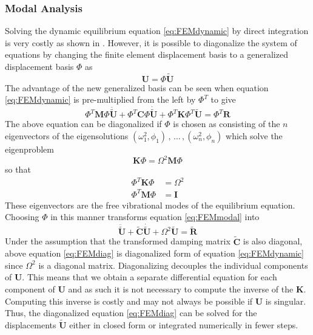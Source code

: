\documentclass[11pt,a4paper,twoside]{report}
\begin{document}
\subsubsection{Modal Analysis}
Solving the dynamic equilibrium equation \ref{eq:FEMdynamic} by direct integration
is very costly as shown in \cite{FEMbook}. However, it is possible to diagonalize the system
of equations by changing the finite element displacement basis to a generalized displacement
basis $\Phi$ as 
\begin{equation}
\mathbf{U} = \Phi \mathbf{\tilde{U}}
\end{equation}
The advantage of the new generalized basis can be seen when equation \ref{eq:FEMdynamic} is pre-multiplied from the left by $\Phi^T$
to give
\begin{equation}\label{eq:FEMmodal}
\Phi^T\mathbf{M}\Phi\mathbf{\ddot{\tilde{U}}} + \Phi^T\mathbf{C}\Phi\mathbf{\dot{\tilde{U}}} + \Phi^T\mathbf{K}\Phi^T\mathbf{\tilde{U}}
= \Phi^T\mathbf{R}
\end{equation}
The above equation can be diagonalized if $\Phi$ is chosen as consisting of the $n$ eigenvectors of the eigensolutions $(\omega_1^2,\phi_1)\,,\, \dots \,,(\omega_n^2,\phi_n)$ which solve the eigenproblem
\begin{equation}\label{eq:FEMbasis}
\mathbf{K}\Phi = \Omega^2\mathbf{M}\Phi
\end{equation}
so that 
\begin{align}
\Phi^T\mathbf{K}\Phi &= \Omega^2\\
\Phi^T\mathbf{M}\Phi &= \mathbf{I}
\end{align}
These eigenvectors are the free vibrational modes of the equilibrium equation. Choosing $\Phi$ in this manner transforms equation \ref{eq:FEMmodal} into
\begin{equation}\label{eq:FEMdiag}
\mathbf{\ddot{\tilde{U}}} + \mathbf{\tilde{C}}\mathbf{\dot{\tilde{U}}} + \Omega^2\mathbf{\tilde{U}}
= \mathbf{\tilde{R}}
\end{equation}
Under the assumption that the transformed damping matrix $\mathbf{\tilde{C}}$ is also
diagonal, above equation \ref{eq:FEMdiag} is diagonalized form of equation
\ref{eq:FEMdynamic} since
$\Omega^2$ is a diagonal matrix.
Diagonalizing
decouples the individual components of $\mathbf{U}$. This means that we obtain a
separate differential equation for each component of $\mathbf{U}$ and as such it
is not necessary to compute the inverse of the $\mathbf{K}$. Computing this
inverse is costly and may not always be possible if $\mathbf{U}$ is singular. Thus, the
diagonalized equation \ref{eq:FEMdiag} can be solved for the displacements
$\mathbf{\tilde{U}}$ either in closed form or integrated numerically in fewer steps.
\end{document}
